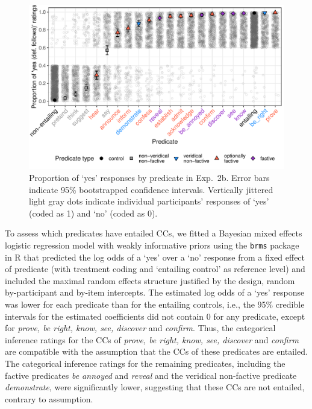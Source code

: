 \documentclass[11pt,fleqn]{article}
\newcommand{\6}{\mbox{$[\hspace*{-.6mm}[$}}
\newcommand{\9}{\mbox{$]\hspace*{-.6mm}]$}}
\begin{document}
\begin{figure}[h!]
\centering
\includegraphics[width=.7\paperwidth]{../../results/7-veridicality3-binary/graphs/proportion-by-predicate-variability-individual}

\caption{Proportion of `yes' responses by predicate in Exp.~2b. Error bars indicate 95\% bootstrapped confidence intervals. Vertically jittered light gray dots indicate individual participants' responses of `yes' (coded as 1) and `no' (coded as 0).}
\label{fig:2bresults}
\end{figure}

To assess which predicates have entailed CCs, we fitted a Bayesian mixed effects logistic regression model with weakly informative priors using the \verb|brms|  package in R that predicted the log odds of a `yes' over a `no' response from a fixed effect of predicate (with treatment coding and `entailing control' as  reference level) and included the maximal random effects structure justified by the design, random by-participant and by-item intercepts. The estimated log odds of a `yes' response was lower for each predicate than for the entailing controls, i.e., the 95\% credible intervals for the estimated coefficients did not contain 0 for any predicate, except for {\em prove, be right, know, see, discover} and {\em confirm}. Thus, the categorical inference ratings for the CCs of {\em prove, be right, know, see, discover} and {\em confirm} are compatible with the assumption that the CCs of these predicates are entailed. The categorical inference ratings for the remaining predicates, including the factive predicates {\em be annoyed} and {\em reveal} and the veridical non-factive predicate {\em demonstrate}, were significantly lower, suggesting that these CCs are not entailed, contrary to assumption. 
\end{document}
